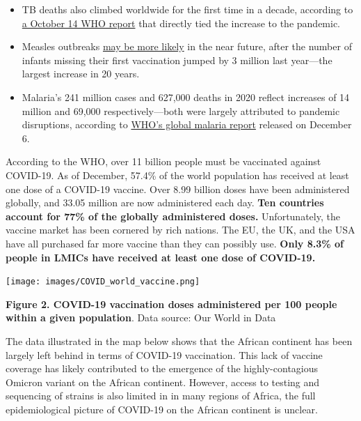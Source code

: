 \documentclass[
  11pt,
  paper=a4,
  ,captions=tableheading
]{scrartcl}
\providecommand{\tightlist}{%
  \setlength{\itemsep}{0pt}\setlength{\parskip}{0pt}}
\begin{document}
\begin{itemize}
\tightlist
\item
  TB deaths also climbed worldwide for the first time in a decade,
  according to
  \href{https://www.who.int/news/item/14-10-2021-tuberculosis-deaths-rise-for-the-first-time-in-more-than-a-decade-due-to-the-covid-19-pandemic}{a
  October 14 WHO report} that directly tied the increase to the
  pandemic.
\item
  Measles outbreaks
  \href{https://www.cdc.gov/mmwr/volumes/70/wr/mm7045a1.htm?s_cid=mm7045a1_w}{may
  be more likely} in the near future, after the number of infants
  missing their first vaccination jumped by 3 million last year---the
  largest increase in 20 years.
\item
  Malaria's 241 million cases and 627,000 deaths in 2020 reflect
  increases of 14 million and 69,000 respectively---both were largely
  attributed to pandemic disruptions, according to
  \href{https://www.who.int/teams/global-malaria-programme/reports/world-malaria-report-2021\#:~:text=According\%20to\%20WHO's\%20latest\%20World,and\%2069\%20000\%20more\%20deaths}{WHO's
  global malaria report} released on December 6.
\end{itemize}

According to the WHO, over 11 billion people must be vaccinated against
COVID-19. As of December, 57.4\% of the world population has received at
least one dose of a COVID-19 vaccine. Over 8.99 billion doses have been
administered globally, and 33.05 million are now administered each day.
\textbf{Ten countries account for 77\% of the globally administered
doses.} Unfortunately, the vaccine market has been cornered by rich
nations. The EU, the UK, and the USA have all purchased far more vaccine
than they can possibly use. \textbf{Only 8.3\% of people in LMICs have
received at least one dose of COVID-19.}

\texttt{[image: images/COVID\_world\_vaccine.png]}

\textbf{Figure 2. COVID-19 vaccination doses administered per 100 people
within a given population}. Data source: Our World in Data

The data illustrated in the map below shows that the African continent
has been largely left behind in terms of COVID-19 vaccination. This lack
of vaccine coverage has likely contributed to the emergence of the
highly-contagious Omicron variant on the African continent. However,
access to testing and sequencing of strains is also limited in in many
regions of Africa, the full epidemiological picture of COVID-19 on the
African continent is unclear.
\end{document}
